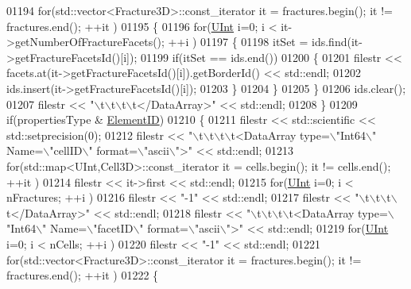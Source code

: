\begin{DoxyCode}
01194         \textcolor{keywordflow}{for}(std::vector<Fracture3D>::const\_iterator it = fractures.begin(); it != fractures.end(); ++it )
01195         \{
01196             \textcolor{keywordflow}{for}(\hyperlink{namespaceFVCode3D_a4bf7e328c75d0fd504050d040ebe9eda}{UInt} i=0; i < it->getNumberOfFractureFacets(); ++i )
01197             \{
01198                 itSet = ids.find(it->getFractureFacetsId()[i]);
01199                 \textcolor{keywordflow}{if}(itSet == ids.end())
01200                 \{
01201                     filestr << facets.at(it->getFractureFacetsId()[i]).getBorderId() << std::endl;
01202                     ids.insert(it->getFractureFacetsId()[i]);
01203                 \}
01204             \}
01205         \}
01206         ids.clear();
01207         filestr << \textcolor{stringliteral}{"\(\backslash\)t\(\backslash\)t\(\backslash\)t\(\backslash\)t</DataArray>"} << std::endl;
01208     \}
01209     \textcolor{keywordflow}{if}(propertiesType & \hyperlink{namespaceFVCode3D_ab3abc77722284ce4344be90bb61c1a41a864b9d45a578bf09e82a32916c9c3c03}{ElementID})
01210     \{
01211         filestr << std::scientific << std::setprecision(0);
01212         filestr << \textcolor{stringliteral}{"\(\backslash\)t\(\backslash\)t\(\backslash\)t\(\backslash\)t<DataArray type=\(\backslash\)"Int64\(\backslash\)" Name=\(\backslash\)"cellID\(\backslash\)" format=\(\backslash\)"ascii\(\backslash\)">"} << std::endl;
01213         \textcolor{keywordflow}{for}(std::map<UInt,Cell3D>::const\_iterator it = cells.begin(); it != cells.end(); ++it )
01214             filestr << it->first << std::endl;
01215         \textcolor{keywordflow}{for}(\hyperlink{namespaceFVCode3D_a4bf7e328c75d0fd504050d040ebe9eda}{UInt} i=0; i < nFractures; ++i )
01216             filestr << \textcolor{stringliteral}{"-1"} << std::endl;
01217         filestr << \textcolor{stringliteral}{"\(\backslash\)t\(\backslash\)t\(\backslash\)t\(\backslash\)t</DataArray>"} << std::endl;
01218         filestr << \textcolor{stringliteral}{"\(\backslash\)t\(\backslash\)t\(\backslash\)t\(\backslash\)t<DataArray type=\(\backslash\)"Int64\(\backslash\)" Name=\(\backslash\)"facetID\(\backslash\)" format=\(\backslash\)"ascii\(\backslash\)">"} << std::endl;
01219         \textcolor{keywordflow}{for}(\hyperlink{namespaceFVCode3D_a4bf7e328c75d0fd504050d040ebe9eda}{UInt} i=0; i < nCells; ++i )
01220             filestr << \textcolor{stringliteral}{"-1"} << std::endl;
01221         \textcolor{keywordflow}{for}(std::vector<Fracture3D>::const\_iterator it = fractures.begin(); it != fractures.end(); ++it )
01222         \{

\end{DoxyCode}
